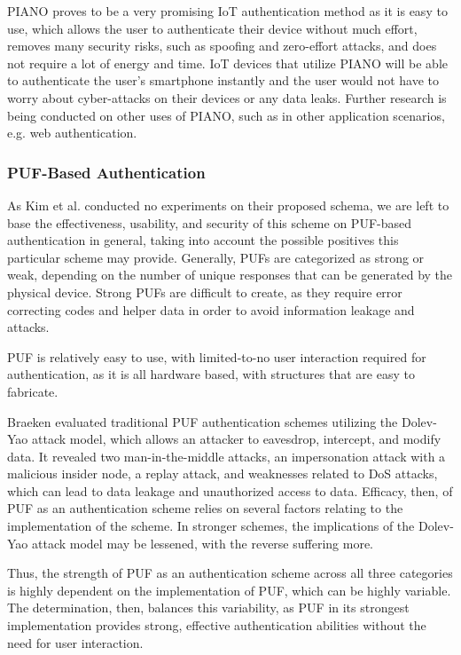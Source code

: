 \documentclass[10pt,twocolumn,letterpaper]{article}
\begin{document}
PIANO proves to be a very promising IoT authentication method as it is easy to use, which allows the user to authenticate their device without much effort, removes many security risks, such as spoofing and zero-effort attacks, and does not require a lot of energy and time. IoT devices that utilize PIANO will be able to authenticate the user’s smartphone instantly and the user would not have to worry about cyber-attacks on their devices or any data leaks. Further research is being conducted on other uses of PIANO, such as in other application scenarios, e.g. web authentication.

\subsubsection{PUF-Based Authentication}

As Kim et al. \cite{puf} conducted no experiments on their proposed schema, we are left to base the effectiveness, usability, and security of this scheme on PUF-based authentication in general, taking into account the possible positives this particular scheme may provide. Generally, PUFs are categorized as strong or weak, depending on the number of unique responses that can be generated by the physical device. Strong PUFs are difficult to create, as they require error correcting codes and helper data in order to avoid information leakage and attacks. 

PUF is relatively easy to use, with limited-to-no user interaction required for authentication, as it is all hardware based, with structures that are easy to fabricate.

Braeken \cite{puf_braeken} evaluated traditional PUF authentication schemes utilizing the Dolev-Yao attack model, which allows an attacker to eavesdrop, intercept, and modify data. It revealed two man-in-the-middle attacks, an impersonation attack with a malicious insider node, a replay attack, and weaknesses related to DoS attacks, which can lead to data leakage and unauthorized access to data. 
Efficacy, then, of PUF as an authentication scheme relies on several factors relating to the implementation of the scheme. In stronger schemes, the implications of the Dolev-Yao attack model may be lessened, with the reverse suffering more.

Thus, the strength of PUF as an authentication scheme across all three categories is highly dependent on the implementation of PUF, which can be highly variable. The determination, then, balances this variability, as PUF in its strongest implementation provides strong, effective authentication abilities without the need for user interaction.
\end{document}
